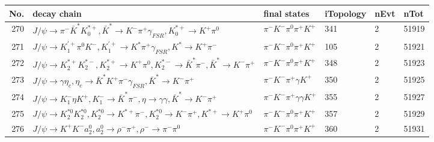 \begin{table}[htbp] 
\begin{center}
\begin{small}
\begin{tabular}{rlllll}\hline\hline
 No. & decay chain & final states &  iTopology & nEvt & nTot \\\hline
270&$J/\psi       \rightarrow \pi^{-}        \bar{K}^{*}   K_{0}^{*+}     , \bar{K}^{*}    \rightarrow K^{-}          \pi^{+}        \gamma_{FSR} , K_{0}^{*+}      \rightarrow K^{+}          \pi^{0}        $&$\pi^{-}        K^{-}          \pi^{0}        \pi^{+}        K^{+}          $&  341&    2&51919\\
271&$J/\psi       \rightarrow K_1^{'+}      \pi^{0}        K^{-}          , K_1^{'+}       \rightarrow K^{*}          \pi^{+}        \gamma_{FSR} , K^{*}           \rightarrow K^{+}          \pi^{-}        $&$\pi^{-}        K^{-}          \pi^{0}        \pi^{+}        K^{+}          $&  105&    2&51921\\
272&$J/\psi       \rightarrow K_2^{*+}       K_2^{*-}       , K_2^{*+}        \rightarrow K^{+}          \pi^{0}        , K_2^{*-}        \rightarrow \bar{K}^{*}   \pi^{-}        , \bar{K}^{*}    \rightarrow K^{-}          \pi^{+}        $&$\pi^{-}        K^{-}          \pi^{0}        \pi^{+}        K^{+}          $&  348&    2&51923\\
273&$J/\psi       \rightarrow \gamma       \eta_{c}    , \eta_{c}     \rightarrow \bar{K}^{*}   K^{+}          \pi^{-}        \gamma_{FSR} , \bar{K}^{*}    \rightarrow K^{-}          \pi^{+}        $&$\pi^{-}        K^{-}          \pi^{+}        \gamma       K^{+}          $&  350&    2&51925\\
274&$J/\psi       \rightarrow K_{1}^{-}      \eta          K^{+}          , K_{1}^{-}       \rightarrow \bar{K}^{*}   \pi^{-}        , \eta           \rightarrow \gamma       \gamma       , \bar{K}^{*}    \rightarrow K^{-}          \pi^{+}        $&$\pi^{-}        K^{-}          \pi^{+}        \gamma       \gamma       K^{+}          $&  355&    2&51927\\
275&$J/\psi       \rightarrow K_2^{*0}       K_2^{*0}       , K_2^{*0}        \rightarrow K^{*+}         \pi^{-}        , K_2^{*0}        \rightarrow K^{-}          \pi^{+}        , K^{*+}          \rightarrow K^{+}          \pi^{0}        $&$\pi^{-}        K^{-}          \pi^{0}        \pi^{+}        K^{+}          $&  357&    2&51929\\
276&$J/\psi       \rightarrow K^{+}          K^{-}          a_{2}^{0}      , a_{2}^{0}       \rightarrow \rho^{-}      \pi^{+}        , \rho^{-}       \rightarrow \pi^{-}        \pi^{0}        $&$\pi^{-}        K^{-}          \pi^{0}        \pi^{+}        K^{+}          $&  360&    2&51931\\

\end{tabular}
\end{small}
\end{center}
\end{table}
